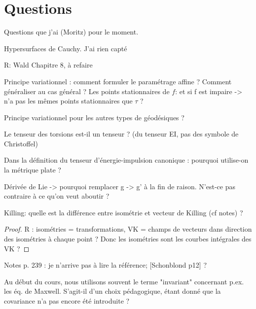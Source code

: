 \chapter{Questions}
Questions que j'ai (Moritz) pour le moment.
\begin{quest}
    Hypersurfaces de Cauchy. J'ai rien capté
\end{quest}
R: Wald Chapitre 8, à refaire

\begin{quest}
    Principe variationnel : comment formuler le paramétrage affine ? Comment généraliser au cas général ?
    Les points stationnaires de $f$: et si f est impaire -> n'a pas les mêmes points stationnaires que $\tau$ ? 
\end{quest}
\begin{quest}
    Principe variationnel pour les autres types de géodésiques ?
\end{quest}

\begin{quest}
    Le tenseur des torsions est-il un tenseur ? (du tenseur EI, pas des symbole de Christoffel)
\end{quest}
\begin{quest}
    Dans la définition du tenseur d'énergie-impulsion canonique : pourquoi utilise-on la métrique plate ?
\end{quest}
\begin{quest}
    Dérivée de Lie -> pourquoi remplacer g -> g' à la fin de raison. N'est-ce pas contraire à ce qu'on veut aboutir ?
\end{quest}
\begin{quest}
    Killing: quelle est la différence entre isométrie et vecteur de Killing (cf notes) ?
\end{quest}
\begin{proof}
    R : isométries = transformations, VK = champs de vecteurs dans direction des isométries à chaque point ? Donc les isométries sont les courbes intégrales des VK ?
\end{proof}
\begin{quest}
    Notes p. 239 : je n'arrive pas à lire la référence; [Schonblond p12] ?
\end{quest}
\begin{quest}
    Au début du cours, nous utilisons souvent le terme "invariant" concernant p.ex. les éq. de Maxwell. S'agit-il d'un choix pédagogique, étant donné que la covariance n'a pas encore été introduite ?
\end{quest}